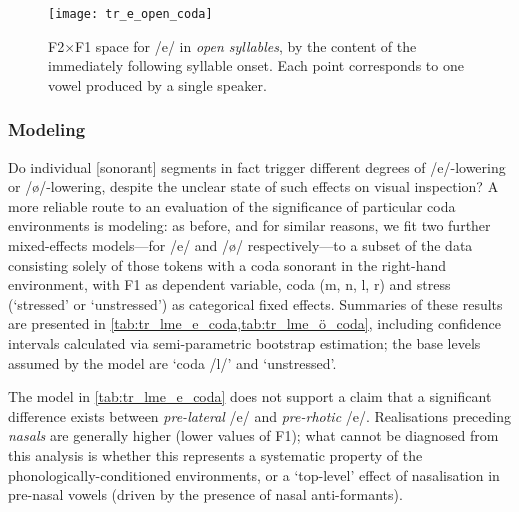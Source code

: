 \begin{figure}[H]
  \centering
  \texttt{[image: tr\_e\_open\_coda]}
  \caption[F2$\times$F1 space for /e/ in open syllables preceding sonorant onsets.]{F2$\times$F1 space for /e/ in \textit{open syllables}, by the content of the immediately following syllable onset. Each point corresponds to one vowel produced by a single speaker.}
  \label{fig:tr_e_open_codas}
\end{figure}

\subsubsection{Modeling}\label{sss:trcodamodel}

Do individual [sonorant] segments in fact trigger different degrees of /e/-lowering or /\o/-lowering, despite the unclear state of such effects on visual inspection? A more reliable route to an evaluation of the significance of particular coda environments is modeling: as before, and for similar reasons, we fit two further mixed-effects models---for /e/ and /\o/ respectively---to a subset of the data consisting solely of those tokens with a coda sonorant in the right-hand environment, with F1 as dependent variable, coda (m, n, l, r) and stress (`stressed' or `unstressed') as categorical fixed effects. Summaries of these results are presented in \cref{tab:tr_lme_e_coda,tab:tr_lme_ö_coda}, including confidence intervals calculated via semi-parametric bootstrap estimation; the base levels assumed by the model are `coda /l/' and `unstressed'.

The model in \cref{tab:tr_lme_e_coda} does not support a claim that a significant difference exists between \emph{pre-lateral} /e/ and \emph{pre-rhotic} /e/. Realisations preceding \emph{nasals} are generally higher (lower values of F1); what cannot be diagnosed from this analysis is whether this represents a systematic property of the phonologically-conditioned environments, or a `top-level' effect of nasalisation in pre-nasal vowels (driven by the presence of nasal anti-formants).

